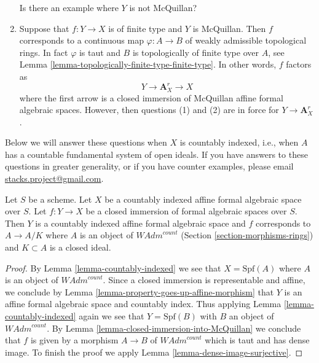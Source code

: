 \begin{remark}
\begin{enumerate}
Is there an example where $Y$ is not McQuillan?
\item Suppose that $f : Y \to X$ is of finite type and $Y$ is McQuillan.
Then $f$ corresponds to a continuous map $\varphi : A \to B$ of weakly
admissible topological rings. In fact $\varphi$ is taut and
$B$ is topologically of finite type over $A$, see
Lemma \ref{lemma-topologically-finite-type-finite-type}.
In other words, $f$ factors as
$$
Y \longrightarrow \mathbf{A}^r_X \longrightarrow X
$$
where the first arrow is a closed immersion of McQuillan affine
formal algebraic spaces. However, then questions (1) and
(2) are in force for $Y \to \mathbf{A}^r_X$.
\end{enumerate}
Below we will answer these questions when
$X$ is countably indexed, i.e., when $A$ has a countable fundamental
system of open ideals. If you have answers to these questions
in greater generality, or if you have counter examples, please email
\href{mailto:stacks.project@gmail.com}{stacks.project@gmail.com}.
\end{remark}

\begin{lemma}
\label{lemma-closed-immersion-into-countably-indexed}
Let $S$ be a scheme. Let $X$ be a countably indexed affine formal algebraic
space over $S$. Let $f : Y \to X$ be a closed immersion of formal algebraic
spaces over $S$. Then $Y$ is a countably indexed affine formal algebraic space
and $f$ corresponds to $A \to A/K$ where $A$ is an object of
$\textit{WAdm}^{count}$
(Section \ref{section-morphisms-rings})
and $K \subset A$ is a closed ideal.
\end{lemma}

\begin{proof}
By Lemma \ref{lemma-countably-indexed}
we see that $X = \text{Spf}(A)$ where $A$ is an object of
$\textit{WAdm}^{count}$. Since a closed immersion is representable
and affine, we conclude by Lemma \ref{lemma-property-goes-up-affine-morphism}
that $Y$ is an affine formal algebraic space and countably index.
Thus applying Lemma \ref{lemma-countably-indexed}
again we see that $Y = \text{Spf}(B)$ with $B$ an object of
$\textit{WAdm}^{count}$. By Lemma \ref{lemma-closed-immersion-into-McQuillan}
we conclude that $f$ is given by a morphism $A \to B$ of
$\textit{WAdm}^{count}$ which is taut and has dense image.
To finish the proof we apply
Lemma \ref{lemma-dense-image-surjective}.
\end{proof}

